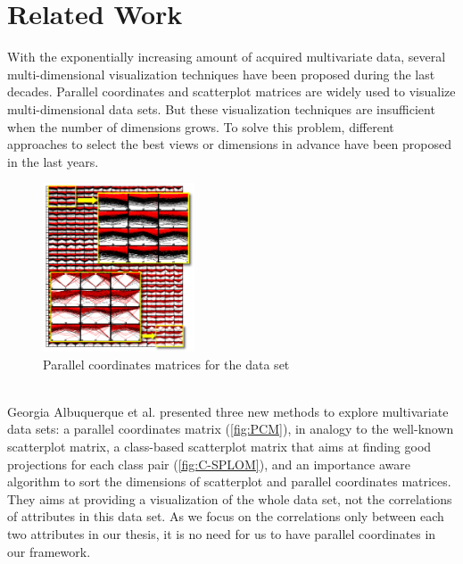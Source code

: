 
\chapter{Related Work}
\label{ch:RelatedWork}
With the exponentially increasing amount of acquired multivariate data, several multi-dimensional visualization techniques have been proposed during the last decades. Parallel coordinates and scatterplot matrices are widely used to visualize multi-dimensional data sets. But these visualization techniques are insufficient when the number of dimensions grows. To solve this problem, different approaches to select the best views or dimensions in advance have been proposed in the last years.\\ 
\begin{figure}[h]
	\centering
	\includegraphics[width=0.4\textwidth]{pictures/PCM}
	\caption{Parallel coordinates matrices\cite{Matrics} for the data set}
	\label{fig:PCM}
\end{figure}
\\Georgia Albuquerque et al. presented three new methods to explore multivariate data sets: a parallel coordinates matrix (\autoref{fig:PCM}), in analogy to the well-known scatterplot matrix, a class-based scatterplot matrix that aims at finding good projections for each class pair (\autoref{fig:C-SPLOM}), and an importance aware algorithm\cite{Matrics} to sort the dimensions of scatterplot and parallel coordinates matrices. They aims at providing a visualization of the whole data set, not the correlations of attributes in this data set. As we focus on the correlations only between each two attributes in our thesis, it is no need for us to have parallel coordinates in our framework.
